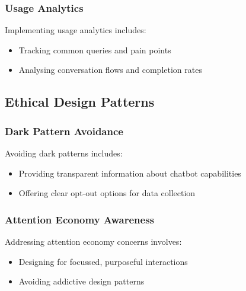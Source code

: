\documentclass[14pt,a4paper]{article}
\begin{document}
\begin{multicols}{2}
\subsubsection{Usage Analytics}
Implementing usage analytics \textit{\parencite[pp. 50-100]{Beasley2023}} includes:
\begin{itemize}
    \item Tracking common queries and pain points
    \item Analysing conversation flows and completion rates
\end{itemize}

\subsection{Ethical Design Patterns}
\subsubsection{Dark Pattern Avoidance}
Avoiding dark patterns \textit{\parencite{Brignull2023}} includes:
\begin{itemize}
    \item Providing transparent information about chatbot capabilities
    \item Offering clear opt-out options for data collection
\end{itemize}


\subsubsection{Attention Economy Awareness}
Addressing attention economy concerns \textit{\parencite[pp. 10-30]{Williams2024}} involves:
\begin{itemize}
    \item Designing for focussed, purposeful interactions
    \item Avoiding addictive design patterns
\end{itemize}









\end{multicols}
\end{document}
